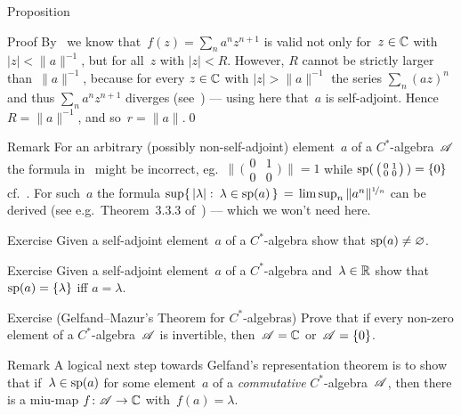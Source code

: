 \documentclass[a]{subfiles}
\begin{document}
\begin{parsec}
\begin{point}{Proposition}
\begin{point}{Proof}
By~
we know that~$f(z)=\sum_n a^nz^{n+1}$
is valid not only for~$z\in \mathbb{C}$ with $\left|z\right|< \|a\|^{-1}$,
but for all~$z$ with $\left|z\right|< R$.
However, $R$ cannot be strictly larger than~$\|a\|^{-1}$,
because for every $z\in\mathbb{C}$ with $\left|z\right|>\|a\|^{-1}$
the series $\sum_n(az)^n$ 
and thus $\sum_n a^n{z}^{n+1}$ diverges (see~)
--- using here that~$a$ is self-adjoint.
Hence~$R=\|a\|^{-1}$, and so~$r=\|a\|$.\qed
\end{point}
\end{point}
\begin{point}{Remark}%
For an arbitrary (possibly non-self-adjoint)
element~$a$ of a $C^*$-algebra~$\mathscr{A}$
the formula in~
might be incorrect, eg.~$\bigl\|\,\bigl(\begin{smallmatrix}
0& 1\\
0 & 0
\end{smallmatrix}\bigr)\,\|=1$
while 
$\mathrm{sp}(\,\bigl(\begin{smallmatrix}
0& 1\\
0 & 0
\end{smallmatrix}\bigr)\,)=\{0\}$
cf.~.
For such~$a$
the formula
$\sup\{\,\left|\lambda\right|\colon\, \lambda\in \mathrm{sp}(a)\,\}
\,=\, \limsup_n \|a^n\|^{\nicefrac{1}{n}}$
	can be derived (see e.g.~Theorem~3.3.3 of~\cite{kr}) --- 
	which we won't need here.
\end{point}
\begin{point}{Exercise}%
Given a self-adjoint element~$a$ of a $C^*$-algebra show that
$\mathrm{sp}(a)\neq \varnothing$.
\end{point}
\begin{point}{Exercise}%
Given a self-adjoint element~$a$ of a $C^*$-algebra
and~$\lambda\in\mathbb{R}$
show that $\mathrm{sp}(a) =\{\lambda\}$ iff $a=\lambda$.
\end{point}
\begin{point}{Exercise (Gelfand--Mazur's Theorem for $C^*$-algebras)}%
%
Prove that if every non-zero element of a $C^*$-algebra~$\mathscr{A}$
is invertible, then~$\mathscr{A}=\mathbb{C}$ or~$\mathscr{A}=\{0\}$.
\end{point}
\begin{point}{Remark}%
A logical next step
towards Gelfand's representation theorem
is to show that if~$\lambda\in\mathrm{sp}(a)$
for some element~$a$ of a \emph{commutative} $C^*$-algebra~$\mathscr{A}$,
then there is a miu-map $f\colon \mathscr{A}\to \mathbb{C}$
with~$f(a)=\lambda$.

\end{point}
\end{parsec}
\end{document}
